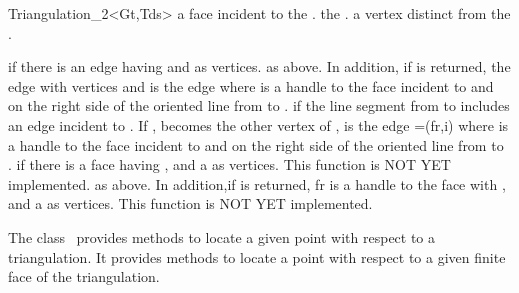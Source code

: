 \begin{ccClassTemplate}{Triangulation_2<Gt,Tds>}
{a  face incident to the .}
\ccGlue
{}
{the .}
\ccGlue
{}
{a vertex distinct from  the .}

{ if there is an edge having  and  as
vertices.}
\ccGlue
{}
{ as above. In addition, if  is returned,  the edge with
vertices  and  is the edge  where
 is a handle to the face incident to  and 
on the right side of the oriented line from  to .}
\ccGlue
{}
{ if the line segment from  to  includes
an edge  incident to . If ,  becomes
the other vertex of ,  is the edge \ccc={(fr,i)} where
 is a handle to the face incident to  and 
on the right side of the oriented line from  to .}
\ccGlue
{}
{ if there is a face having ,  and a 
as vertices. This function is NOT YET implemented.}
\ccGlue
{}
{as above. In addition,if  is returned, fr is a handle
to the face with  ,  and a 
as vertices. This function is NOT YET implemented.} 



The class \ccClassTemplateName\  provides methods to locate
a given point with respect to a triangulation. It provides
methods to locate a point with respect to
a given  finite face of the triangulation.



\end{ccClassTemplate}
